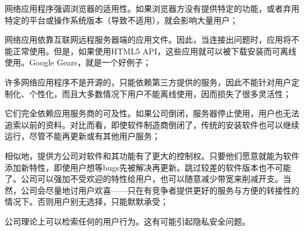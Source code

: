 \begin{compactitem}
\item 网络应用程序强调浏览器的适用性。如果浏览器方没有提供特定的功能，或者弃用特定的平台或操作系统版本（导致不适用），就会影响大量用户；
\item 网络应用依靠互联网远程服务器端的应用文件。因此，当连接出问题时，应用将不能正常使用。但是，如果使用HTML5 API，这些应用就可以被下载安装而可离线使用。Google Gears，就是一个好例子；
\item 许多网络应用程序不是开源的，只能依赖第三方提供的服务，因此不能针对用户定制化、个性化，而且大多数情况下用户不能离线使用，因而损失了很多灵活性；
\item 它们完全依赖应用服务商的可及性。如果公司倒闭，服务器停止使用，用户也无法追索以前的资料。对比而看，即使软件制造商倒闭了，传统的安装软件也可以继续运行，尽管不能再更新或有其他用户服务；
\item 相似地，提供方公司对软件和其功能有了更大的控制权。只要他们愿意就能为软件添加新特性，即使用户想等bugs先被解决再更新。跳过较差的软件版本也不可能了。公司可以强加不受欢迎的特性给用户，也可以随意减少带宽来削减开支。当然，公司会尽量地讨用户欢喜——只在有竞争者提供更好的服务与方便的转接性的情况下。否则用户别无选择，只能默默承受；
\item 公司理论上可以检索任何的用户行为。这有可能引起隐私安全问题。
\end{compactitem}


\clearpage



































